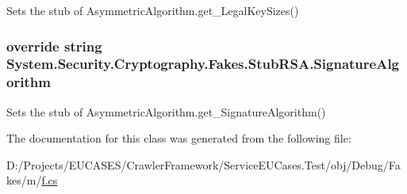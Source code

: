 Sets the stub of Asymmetric\-Algorithm.\-get\-\_\-\-Legal\-Key\-Sizes()

\hypertarget{class_system_1_1_security_1_1_cryptography_1_1_fakes_1_1_stub_r_s_a_ae81c5938fdcd79b551214ca5a1f9e207}{
\subsubsection[{Signature\-Algorithm}]{\setlength{\rightskip}{0pt plus 5cm}override string System.\-Security.\-Cryptography.\-Fakes.\-Stub\-R\-S\-A.\-Signature\-Algorithm\hspace{0.3cm}{\ttfamily [get]}}}\label{class_system_1_1_security_1_1_cryptography_1_1_fakes_1_1_stub_r_s_a_ae81c5938fdcd79b551214ca5a1f9e207}


Sets the stub of Asymmetric\-Algorithm.\-get\-\_\-\-Signature\-Algorithm()



The documentation for this class was generated from the following file\-:\begin{DoxyCompactItemize}
\item 
D\-:/\-Projects/\-E\-U\-C\-A\-S\-E\-S/\-Crawler\-Framework/\-Service\-E\-U\-Cases.\-Test/obj/\-Debug/\-Fakes/m/\hyperlink{m_2f_8cs}{f.\-cs}\end{DoxyCompactItemize}
